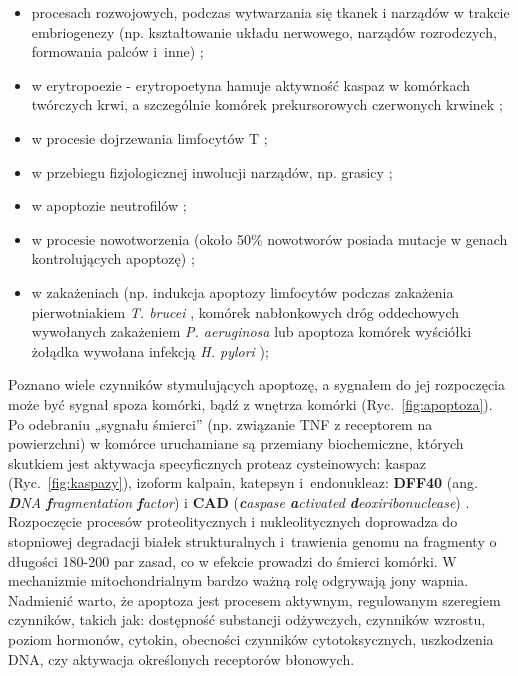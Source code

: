 \begin{itemize}
\item procesach rozwojowych, podczas wytwarzania się tkanek i narządów w trakcie embriogenezy (np. kształtowanie układu nerwowego, narządów rozrodczych, formowania palców i~inne) \cite{Fuchs2011,Jacobson1997};
\item w erytropoezie - erytropoetyna hamuje aktywność kaspaz w komórkach twórczych krwi, a szczególnie komórek prekursorowych czerwonych krwinek \cite{Testa2004};
\item w procesie dojrzewania limfocytów T \cite{Golab2013};
\item w przebiegu fizjologicznej inwolucji narządów, np. grasicy \cite{Dooley2012};
\item w apoptozie neutrofilów \cite{Golab2013};
\item w procesie nowotworzenia (około 50\% nowotworów posiada mutacje w genach kontrolujących apoptozę) \cite{Sun2009};
\item w zakażeniach (np. indukcja apoptozy limfocytów podczas zakażenia pierwotniakiem \emph{T. brucei} \cite{Bockstal2011}, komórek nabłonkowych dróg oddechowych wywołanych zakażeniem \emph{P. aeruginosa} \cite{Losa2014} lub apoptoza komórek wyściółki żołądka wywołana infekcją \emph{H. pylori} \cite{Xia2001});
\end{itemize}

Poznano wiele czynników stymulujących apoptozę, a sygnałem do jej rozpoczęcia może być sygnał spoza komórki, bądź z wnętrza komórki (Ryc.~\ref{fig:apoptoza}). Po odebraniu „sygnału śmierci” (np. związanie TNF z receptorem na powierzchni) w komórce uruchamiane są przemiany biochemiczne, których skutkiem jest aktywacja specyficznych proteaz cysteinowych: kaspaz (Ryc.~\ref{fig:kaspazy}), izoform kalpain, katepsyn \cite{Goll2003,Smith2012} i~endonukleaz: \textbf{DFF40} (ang. \textit{\textbf{D}NA \textbf{f}ragmentation \textbf{f}actor})  i \textbf{CAD} (\textit{\textbf{c}aspase \textbf{a}ctivated \textbf{d}eoxiribonuclease}) \cite{Chang2000,Klyszejko2002,Widak2000}. Rozpoczęcie procesów proteolitycznych i nukleolitycznych doprowadza do stopniowej degradacji białek strukturalnych i~trawienia genomu na fragmenty o długości 180-200 par zasad, co w efekcie prowadzi do śmierci komórki. W mechanizmie mitochondrialnym bardzo ważną rolę odgrywają jony wapnia. Nadmienić warto, że apoptoza jest procesem aktywnym, regulowanym szeregiem czynników, takich jak: dostępność substancji odżywczych, czynników wzrostu, poziom hormonów, cytokin, obecności czynników cytotoksycznych, uszkodzenia DNA, czy aktywacja określonych receptorów błonowych.
\clearpage

